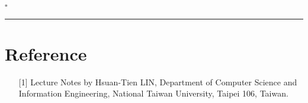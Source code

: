 \documentclass[12pt]{article}
\newcommand*{\QEDB}{\hfill\ensuremath{\square}}
\newcommand{\horrule}[1]{\rule{\linewidth}{#1}}
\begin{document}
\QEDB

\horrule{0.5pt}

\section*{Reference}

\begin{enumerate}

\item[{[1]}] Lecture Notes by Hsuan-Tien LIN, Department of Computer Science and Information Engineering, National Taiwan University, Taipei 106, Taiwan.

\end{enumerate}
\end{document}
